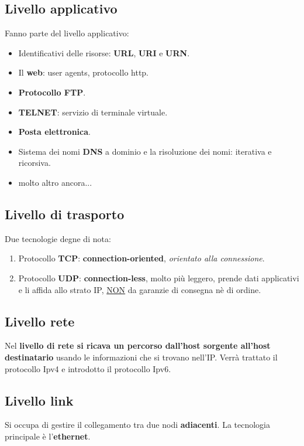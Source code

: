 \documentclass[11pt,a4paper,oneside]{book}
\theoremstyle{definition}
\begin{document}
\pagebreak

\subsection{Livello applicativo}
Fanno parte del livello applicativo:
\begin{itemize}
	\item Identificativi delle risorse: \textbf{URL}, \textbf{URI} e \textbf{URN}.
	\item Il \textbf{web}: user agents, protocollo http.
	\item \textbf{Protocollo FTP}.
	\item \textbf{TELNET}: servizio di terminale virtuale.
	\item \textbf{Posta elettronica}.
	\item Sistema dei nomi \textbf{DNS} a dominio e la risoluzione dei nomi: iterativa e ricorsiva.
	\item molto altro ancora...
\end{itemize}

\subsection{Livello di trasporto}
Due tecnologie degne di nota:
\begin{enumerate}
	\item Protocollo \textbf{TCP}: \textbf{connection-oriented}, \textit{orientato alla connessione}.
	\item Protocollo \textbf{UDP}: \textbf{connection-less}, molto più leggero, prende dati applicativi e li affida allo strato IP, \underline{NON} da garanzie di consegna nè di ordine.
\end{enumerate}

\subsection{Livello rete}
Nel \textbf{livello di rete si ricava un percorso dall'host sorgente all'host destinatario} usando le informazioni che si trovano nell'IP.\newline
Verrà trattato il protocollo Ipv4 e introdotto il protocollo Ipv6.

\subsection{Livello link}
Si occupa di gestire il collegamento tra due nodi \textbf{adiacenti}.
La tecnologia principale è l'\textbf{ethernet}.
\end{document}
